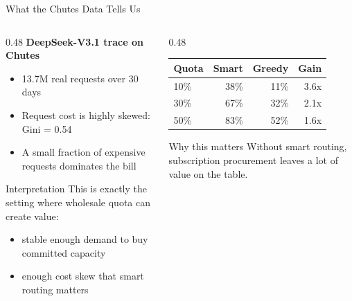 \documentclass[aspectratio=169,10pt]{beamer}
\begin{document}
\begin{frame}{What the Chutes Data Tells Us}
\begin{columns}[T]
\begin{column}{0.48\textwidth}
\textbf{DeepSeek-V3.1 trace on Chutes}
\begin{itemize}
    \item 13.7M real requests over 30 days
    \item Request cost is highly skewed: Gini = 0.54
    \item A small fraction of expensive requests dominates the bill
\end{itemize}

\vspace{0.15cm}
\begin{block}{Interpretation}
\small
This is exactly the setting where wholesale quota can create value:
\begin{itemize}
    \item stable enough demand to buy committed capacity
    \item enough cost skew that smart routing matters
\end{itemize}
\end{block}
\end{column}

\begin{column}{0.48\textwidth}
\centering
\begin{tabular}{lrrr}
\toprule
Quota & Smart & Greedy & Gain \\
\midrule
10\% & 38\% & 11\% & 3.6x \\
30\% & 67\% & 32\% & 2.1x \\
50\% & 83\% & 52\% & 1.6x \\
\bottomrule
\end{tabular}

\vspace{0.2cm}
\begin{alertblock}{Why this matters}
\small
Without smart routing, subscription procurement leaves a lot of value on the table.
\end{alertblock}
\end{column}
\end{columns}
\end{frame}
\end{document}
